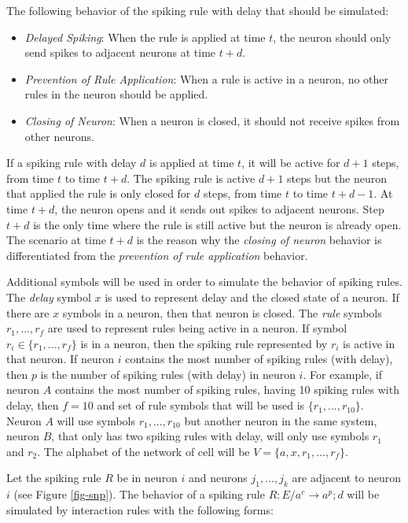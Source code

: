 \documentclass[a4paper]{article}
\theoremstyle{definition}
\newcommand{\ra}{\rightarrow}
\begin{document}
The following behavior of the spiking rule with delay that should be simulated:
\begin{itemize}
\item \emph{Delayed Spiking}: When the rule is applied at time $t$, the neuron should only send
      spikes to adjacent neurons at time $t+d$.
\item \emph{Prevention of Rule Application}: When a rule is active in a neuron, no other rules in 
      the neuron should be applied. 
\item \emph{Closing of Neuron}: When a neuron is closed, it should not receive spikes from other 
      neurons.
\end{itemize}

If a spiking rule with delay $d$ is applied at time $t$, it will be active for $d+1$ steps, from 
time $t$ to time $t+d$. The spiking rule is active $d+1$ steps but the neuron that applied the rule 
is only closed for $d$ steps, from time $t$ to time $t+d-1$. At time $t+d$, the neuron opens and it
sends out spikes to adjacent neurons. Step $t+d$ is the only time where the rule is still active 
but the neuron is already open. The scenario at time $t+d$ is the reason why the \emph{closing of
neuron} behavior is differentiated from the \emph{prevention of rule application} behavior.

Additional symbols will be used in order to simulate the behavior of spiking rules. The \emph{delay}
symbol $x$ is used to represent delay and the closed state of a neuron. If there are $x$ symbols 
in a  neuron, then that neuron is closed. The \emph{rule} symbols $r_1,...,r_f$ are used to 
represent rules being active in a neuron. If symbol $r_i \in \{r_1,...,r_f\}$ is in a neuron, then 
the spiking rule represented by $r_i$ is active in that neuron. If neuron $i$ contains the 
most number of spiking rules (with delay), then $p$ is the number of spiking rules (with delay) in
neuron $i$. For example, if neuron $A$ contains the most number of spiking rules, having 10 spiking
rules with delay, then $f=10$ and set of rule symbols that will be used is $\{r_1,...,r_{10}\}$.
Neuron $A$ will use symbols $r_1,...,r_{10}$ but another neuron in the same system, neuron $B$, that 
only has two spiking rules with delay, will only use symbols $r_1$ and $r_2$. The alphabet of the 
network of cell will be $V = \{a,x,r_1,...,r_f\}$.

Let the spiking rule $R$ be in neuron $i$ and neurons $j_1,...,j_k$ are adjacent to neuron $i$ (see
Figure \ref{fig-snp}). The behavior of a spiking rule $R: E/a^c \ra a^p;d$ will be simulated by 
interaction rules with the following forms:
\end{document}
